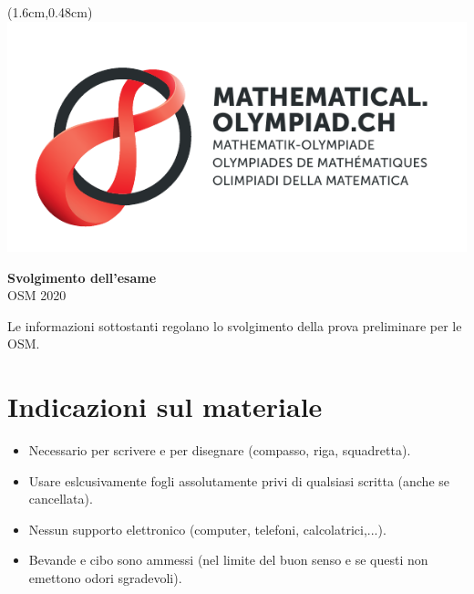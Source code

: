 \documentclass[12pt,a4paper]{article}
\begin{document}
\thispagestyle{empty}

\begin{textblock*}{\paperwidth}(1.6cm,0.48cm) %
\includegraphics[scale=0.67]{Logo_Mathematik_CMYK.pdf}
\end{textblock*}

\vspace*{1.5cm}

\begin{center}
\Huge{\textbf{Svolgimento dell'esame}}\\
\large{OSM 2020}
\end{center}

\bigskip

Le informazioni sottostanti regolano lo svolgimento della prova preliminare per le OSM.

\section{Indicazioni sul materiale}
\begin{itemize}
\item Necessario per scrivere e per disegnare (compasso, riga, squadretta).
\item Usare eslcusivamente fogli assolutamente privi di qualsiasi scritta (anche se cancellata). 
\item Nessun supporto elettronico (computer, telefoni, calcolatrici,...).
\item Bevande e cibo sono ammessi (nel limite del buon senso e se questi non emettono odori sgradevoli).
\end{itemize}
\end{document}
